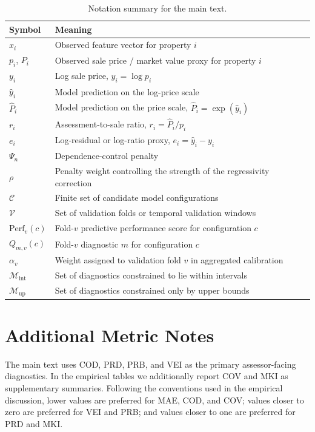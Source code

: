 \documentclass[12pt]{article}
\theoremstyle{plain}
\theoremstyle{definition}
\begin{document}
\begin{table}[h]
\centering
\caption{Notation summary for the main text.}
\label{tab:notation_summary}
\begin{tabular}{p{}p{}}
\toprule
Symbol & Meaning \\
\midrule
\(x_i\) & Observed feature vector for property \(i\) \\
\(p_i\), \(P_i\) & Observed sale price / market value proxy for property \(i\) \\
\(y_i\) & Log sale price, \(y_i=\log p_i\) \\
\(\hat y_i\) & Model prediction on the log-price scale \\
\(\hat P_i\) & Model prediction on the price scale, \(\hat P_i=\exp(\hat y_i)\) \\
\(r_i\) & Assessment-to-sale ratio, \(r_i=\hat P_i/p_i\) \\
\(e_i\) & Log-residual or log-ratio proxy, \(e_i=\hat y_i-y_i\) \\
\(\Psi_n\) & Dependence-control penalty \\
\(\rho\) & Penalty weight controlling the strength of the regressivity correction \\
\(\mathcal C\) & Finite set of candidate model configurations \\
\(\mathcal V\) & Set of validation folds or temporal validation windows \\
\(\mathrm{Perf}_v(c)\) & Fold-\(v\) predictive performance score for configuration \(c\) \\
\(Q_{m,v}(c)\) & Fold-\(v\) diagnostic \(m\) for configuration \(c\) \\
\(\alpha_v\) & Weight assigned to validation fold \(v\) in aggregated calibration \\
\(\mathcal M_{\mathrm{int}}\) & Set of diagnostics constrained to lie within intervals \\
\(\mathcal M_{\mathrm{up}}\) & Set of diagnostics constrained only by upper bounds \\
\bottomrule
\end{tabular}
\end{table}

\section{Additional Metric Notes}

The main text uses COD, PRD, PRB, and VEI as the primary assessor-facing diagnostics. In the empirical tables we additionally report COV and MKI as supplementary summaries. Following the conventions used in the empirical discussion, lower values are preferred for MAE, COD, and COV; values closer to zero are preferred for VEI and PRB; and values closer to one are preferred for PRD and MKI.
\end{document}

